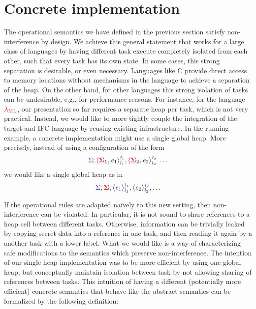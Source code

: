\documentclass{sigplanconf}
\newcommand{\Varid}[1]{\mathit{#1}}
\newcommand{\Red}[1]{{\color{red} #1}}
\begin{document}
\section{Concrete implementation}
\label{sec:concrete}

\newcommand{\con}[1]{\ensuremath{{\color{red} #1}}}
\newcommand{\abs}[1]{\ensuremath{{\color{blue} #1}}}

The operational semantics we have defined in the previous section
satisfy non-interference by design.
We achieve this general statement that works for a large class of
languages by having different task execute completely isolated from
each other, such that every task has its own state.
In some cases, this strong separation is desirable, or even necessary.
Languages like C provide direct access to memory locations without
mechanisms in the language to achieve a separation of the heap.
On the other hand, for other languages this
strong isolation of tasks can be
undesirable, e.g., for performance reasons.
For instance, for the language \ensuremath{\Red{\lambda_{\text{ML}}}}, our presentation so far
requires a separate heap per task, which is not very practical.
Instead, we would like to
more tightly couple the integration of the target and IFC
language by reusing existing infrastructure.  In the running example,
a concrete implementation might use a single global heap.
More precisely, instead of using a configuration of the form
\[\ensuremath{\ifc{\Sigma};\langle \tar{\Sigma}_{1}, \ifc{\Varid{e}}_{1}\rangle^{\ifc{\Varid{i}}_{1}}_{\ifc{\Varid{l}}_{1}},\langle \tar{\Sigma}_{2}, \ifc{\Varid{e}}_{2}\rangle^{\ifc{\Varid{i}}_{2}}_{\ifc{\Varid{l}}_{2}}\;\ldots}\]
we would like a single global heap as in
\[\ensuremath{\ifc{\Sigma};\tar{\Sigma};\langle \ifc{\Varid{e}}_{1}\rangle^{\ifc{\Varid{i}}_{1}}_{\ifc{\Varid{l}}_{1}},\langle \ifc{\Varid{e}}_{2}\rangle^{\ifc{\Varid{i}}_{2}}_{\ifc{\Varid{l}}_{2}},\ldots}\]

If the operational rules are adapted na\"ively to this new setting,
then non-interference can be violated.  In particular, it is not
sound to share references to a heap cell between different tasks.
Otherwise, information can be trivially leaked by copying
secret data into a reference in one task, and then
reading it again by a another task with a lower label.
What we would like is a way of characterizing safe modifications to
the semantics which preserve non-interference.
The intention of our single heap implementation was to be more efficient
by using one global heap, but conceptually maintain isolation between
task by not allowing sharing of references between tasks.
This intuition of having a different (potentially more efficient)
concrete semantics that behave like the abstract semantics
can be formalized by the following definition:
\end{document}
